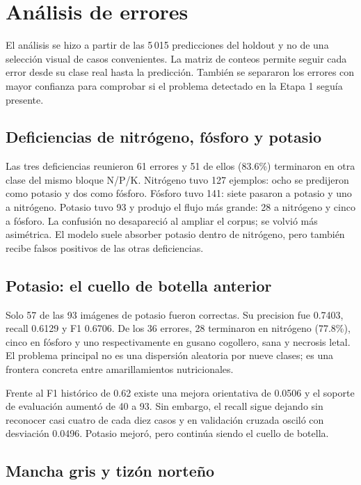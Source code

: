 \section{Análisis de errores}

El análisis se hizo a partir de las 5\,015 predicciones del holdout y no de una
selección visual de casos convenientes. La matriz de conteos permite seguir
cada error desde su clase real hasta la predicción. También se separaron los
errores con mayor confianza para comprobar si el problema detectado en la
Etapa 1 seguía presente.

\subsection{Deficiencias de nitrógeno, fósforo y potasio}

Las tres deficiencias reunieron 61 errores y 51 de ellos (83.6\%) terminaron en
otra clase del mismo bloque N/P/K. Nitrógeno tuvo 127 ejemplos: ocho se
predijeron como potasio y dos como fósforo. Fósforo tuvo 141: siete pasaron a
potasio y uno a nitrógeno. Potasio tuvo 93 y produjo el flujo más grande: 28 a
nitrógeno y cinco a fósforo. La confusión no desapareció al ampliar el corpus;
se volvió más asimétrica. El modelo suele absorber potasio dentro de nitrógeno,
pero también recibe falsos positivos de las otras deficiencias.

\subsection{Potasio: el cuello de botella anterior}

Solo 57 de las 93 imágenes de potasio fueron correctas. Su precision fue 0.7403,
recall 0.6129 y F1 0.6706. De los 36 errores, 28 terminaron en nitrógeno
(77.8\%), cinco en fósforo y uno respectivamente en gusano cogollero, sana y
necrosis letal. El problema principal no es una dispersión aleatoria por nueve
clases; es una frontera concreta entre amarillamientos nutricionales.

Frente al F1 histórico de 0.62 existe una mejora orientativa de 0.0506 y el
soporte de evaluación aumentó de 40 a 93. Sin embargo, el recall sigue dejando
sin reconocer casi cuatro de cada diez casos y en validación cruzada osciló con
desviación 0.0496. Potasio mejoró, pero continúa siendo el cuello de botella.

\subsection{Mancha gris y tizón norteño}

